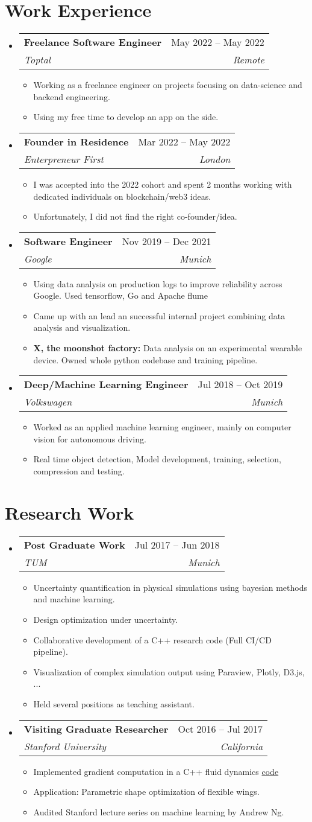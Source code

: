 \documentclass[letterpaper,11pt]{article}
\makeatletter
\newcommand{\resumeItem}[1]{
  \item\small{
    {#1 \vspace{-2pt}}
  }
}
\newcommand{\resumeSubheading}[4]{
  \vspace{-2pt}\item
    \begin{tabular*}{0.97\textwidth}[t]{l@{\extracolsep{\fill}}r}
      \textbf{#1} & #2 \\
      \textit{\small#3} & \textit{\small #4} \\
    \end{tabular*}\vspace{-7pt}
}
\newcommand{\resumeSubHeadingListStart}{\begin{itemize}[leftmargin=0.15in, label={}]}
\newcommand{\resumeSubHeadingListEnd}{\end{itemize}}
\newcommand{\resumeItemListStart}{\begin{itemize}}
\newcommand{\resumeItemListEnd}{\end{itemize}\vspace{-5pt}}
\makeatother
\begin{document}
\section{Work Experience}
  \resumeSubHeadingListStart
    \resumeSubheading
      {Freelance Software Engineer }{May 2022 -- May 2022}
      {Toptal}{Remote}
    \resumeItemListStart
      \resumeItem{Working as a freelance engineer on projects focusing on data-science and backend engineering.}
      \resumeItem{Using my free time to develop an app on the side.}
    \resumeItemListEnd
    \resumeSubheading
      {Founder in Residence }{Mar 2022 -- May 2022}
      {Enterpreneur First}{London}
    \resumeItemListStart
      \resumeItem{I was accepted into the 2022 cohort and spent 2 months working with dedicated individuals on blockchain/web3 ideas.}
      \resumeItem{Unfortunately, I did not find the right co-founder/idea.}
    \resumeItemListEnd
    \resumeSubheading
      {Software Engineer }{Nov 2019 -- Dec 2021}
      {Google}{Munich}
    \resumeItemListStart
      \resumeItem{Using data analysis on production logs to improve reliability across Google. Used tensorflow, Go and Apache flume}
      \resumeItem{Came up with an lead an successful internal project combining data analysis and visualization.}
      \resumeItem{ \textbf{X, the moonshot factory:} Data analysis on an experimental wearable device. Owned whole python codebase and training pipeline.}
    \resumeItemListEnd
    \resumeSubheading
      {Deep/Machine Learning Engineer }{Jul 2018 -- Oct 2019}
      {Volkswagen}{Munich}
    \resumeItemListStart
      \resumeItem{Worked as an applied machine learning engineer, mainly on computer vision for autonomous driving.}
      \resumeItem{Real time object detection, Model development, training, selection, compression and testing.}
    \resumeItemListEnd
  \resumeSubHeadingListEnd

\section{Research Work}
  \resumeSubHeadingListStart
    \resumeSubheading
      {Post Graduate Work }{Jul 2017 -- Jun 2018}
      {TUM}{Munich}
    \resumeItemListStart
      \resumeItem{Uncertainty quantification in physical simulations using bayesian methods and machine learning.}
      \resumeItem{Design optimization under uncertainty.}
      \resumeItem{Collaborative development of a C++ research code (Full CI/CD pipeline).}
      \resumeItem{Visualization of complex simulation output using Paraview, Plotly, D3.js, ...}
      \resumeItem{Held several positions as teaching assistant.}
    \resumeItemListEnd
    \resumeSubheading
      {Visiting Graduate Researcher }{Oct 2016 -- Jul 2017}
      {Stanford University}{California}
    \resumeItemListStart
      \resumeItem{Implemented gradient computation in a C++ fluid dynamics \href{https://bitbucket.org/frg/aero-f/src/master/}{code}}
      \resumeItem{Application: Parametric shape optimization of flexible wings.}
      \resumeItem{Audited Stanford lecture series on machine learning by Andrew Ng.}
    \resumeItemListEnd
  \resumeSubHeadingListEnd
\end{document}
